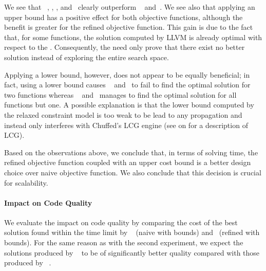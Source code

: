 We see that ~,
, ,
and~ clearly outperform ~ and~.
%
We see also that applying an upper bound has a positive effect for both
\glspl{objective function}, although the benefit is greater for the refined
\gls{objective function}.
%
This gain is due to the fact that, for some \glspl{function}, the \gls{solution}
computed by \gls{LLVM} is already optimal with respect to the
.
%
Consequently, the  need only prove that there exist
no better \gls{solution} instead of exploring the entire \gls{search space}.

Applying a lower bound, however, does not appear to be equally beneficial; in
fact, using a lower bound causes ~ and~ to
fail to find the optimal \gls{solution} for two \glspl{function} whereas
~
and~ manages to find the optimal \gls{solution} for
all \glspl{function} but one.
%
A possible explanation is that the lower bound computed by the relaxed
\gls{constraint model} is too weak to be lead to any \gls{propagation} and
instead only interferes with \gls{Chuffed}'s \gls{LCG} engine (see
 on
 for a description of \gls{LCG}).

Based on the observations above, we conclude that, in terms of solving time, the
refined \gls{objective function} coupled with an upper cost bound is a better
design choice over naive \gls{objective function}.
%
We also conclude that this decision is crucial for scalability.


\paragraph{Impact on Code Quality}

We evaluate the impact on code quality by comparing the cost of the best
\gls{solution} found within the time limit by ~ (naive  with
bounds) and~ (refined  with bounds).
%
For the same reason as with the second experiment, we expect the
\glspl{solution} produced by ~ to be of significantly better quality
compared with those produced by ~.

